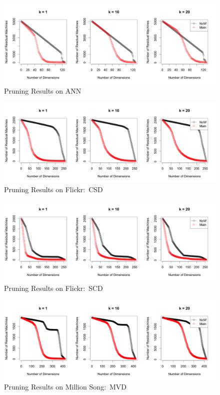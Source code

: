 \begin{figure}[htpb!]
  \centering
  \includegraphics[width=1.0\linewidth]{exp/prune/ANN.png}
  \caption{Pruning Results on ANN}
  \label{fig:prune_ANN}
\end{figure}

\begin{figure}[htpb!]
  \centering
  \includegraphics[width=1.0\linewidth]{exp/prune/f2.png}
  \caption{Pruning Results on Flickr:~CSD}
  \label{fig:prune_f2}
\end{figure}

\begin{figure}[htpb!]
  \centering
  \includegraphics[width=1.0\linewidth]{exp/prune/f3.png}
  \caption{Pruning Results on Flickr:~SCD}
  \label{fig:prune_f3}
\end{figure}

\begin{figure}[htpb!]
  \centering
  \includegraphics[width=1.0\linewidth]{exp/prune/mvd.png}
  \caption{Pruning Results on Million Song:~MVD}
  \label{fig:prune_mvd}
\end{figure}

